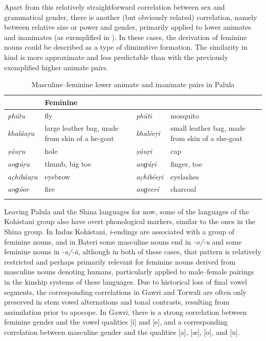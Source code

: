 \documentclass[output=collectionpaper]{langsci/langscibook}
\begin{document}
Apart from this relatively straightforward correlation between sex and grammatical gender, there is another (but obviously related) correlation, namely between relative size or power and gender, primarily applied to lower animates and inanimates (as exemplified in ). In these cases, the derivation of feminine nouns could be described as a type of diminutive formation. The similarity in kind is more approximate and less predictable than with the previously exemplified higher animate pairs.

\begin{table}[htb]
\begin{tabularx}{\textwidth}{>{\itshape}lX>{\itshape}lX}
\lsptoprule

\multicolumn{2}{X}{\normalfont Masculine} & \multicolumn{2}{X}{\normalfont Feminine}\\
\midrule
phútu & fly & phúti & mosquito\\
khaláaṛu & large leather bag, made from skin of a he-goat & khaléeṛi & small leather bag, made from skin of a she-goat\\
ṣúuṛu & hole & ṣúuṛi & cap\\
anɡúṛu & thumb, big toe & anɡúṛi & finger, toe\\
ac̣hibáaṛu & eyebrow & ac̣hibéeṛi & eyelashes\\
anɡóor & fire & anɡeerí & charcoal\\
\lspbottomrule
\end{tabularx}
\caption{Masculine--feminine lower animate and inanimate pairs in Palula}
\label{tab:Lilje:10}
\end{table}


Leaving Palula and the Shina languages for now, some of the languages of the Kohistani group also have overt phonological markers, similar to the ones in the Shina group. In Indus Kohistani, \textit{i}{}-endings are associated with a group of feminine nouns, and in Bateri some masculine nouns end in \textit{\nobreakdash-o/-u} and some feminine nouns in \textit{\nobreakdash-\-a/-ã}, although in both of these cases, that pattern is relatively restricted and perhaps primarily relevant for feminine nouns derived from masculine nouns denoting humans, particularly applied to male--female pairings in the kinship systems of these languages. Due to historical loss of final vowel segments, the corresponding correlations in Gawri and Torwali are often only preserved in stem vowel alternations and tonal contrasts, resulting from assimilation prior to apocope. In Gawri, there is a strong correlation between feminine gender and the vowel qualities [i] and [e], and a corresponding correlation between masculine gender and the qualities [a], [æ], [o], and [u].
\end{document}
